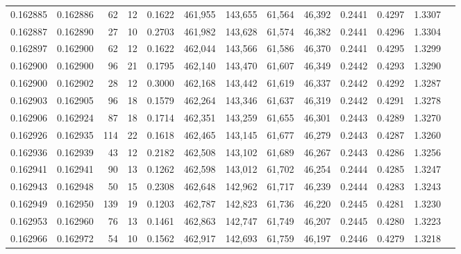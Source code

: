 \begin{tabular}{rrrrrrrrrrrrr}
0.162885 & 0.162886 &    62 &  12 &                                     0.1622 & 461,955 & 143,655 &  61,564 &  46,392 & 0.2441 & 0.4297 & 1.3307 \\
0.162887 & 0.162890 &    27 &  10 &                                     0.2703 & 461,982 & 143,628 &  61,574 &  46,382 & 0.2441 & 0.4296 & 1.3304 \\
0.162897 & 0.162900 &    62 &  12 &                                     0.1622 & 462,044 & 143,566 &  61,586 &  46,370 & 0.2441 & 0.4295 & 1.3299 \\
0.162900 & 0.162900 &    96 &  21 &                                     0.1795 & 462,140 & 143,470 &  61,607 &  46,349 & 0.2442 & 0.4293 & 1.3290 \\
0.162900 & 0.162902 &    28 &  12 &                                     0.3000 & 462,168 & 143,442 &  61,619 &  46,337 & 0.2442 & 0.4292 & 1.3287 \\
0.162903 & 0.162905 &    96 &  18 &                                     0.1579 & 462,264 & 143,346 &  61,637 &  46,319 & 0.2442 & 0.4291 & 1.3278 \\
0.162906 & 0.162924 &    87 &  18 &                                     0.1714 & 462,351 & 143,259 &  61,655 &  46,301 & 0.2443 & 0.4289 & 1.3270 \\
0.162926 & 0.162935 &   114 &  22 &                                     0.1618 & 462,465 & 143,145 &  61,677 &  46,279 & 0.2443 & 0.4287 & 1.3260 \\
0.162936 & 0.162939 &    43 &  12 &                                     0.2182 & 462,508 & 143,102 &  61,689 &  46,267 & 0.2443 & 0.4286 & 1.3256 \\
0.162941 & 0.162941 &    90 &  13 &                                     0.1262 & 462,598 & 143,012 &  61,702 &  46,254 & 0.2444 & 0.4285 & 1.3247 \\
0.162943 & 0.162948 &    50 &  15 &                                     0.2308 & 462,648 & 142,962 &  61,717 &  46,239 & 0.2444 & 0.4283 & 1.3243 \\
0.162949 & 0.162950 &   139 &  19 &                                     0.1203 & 462,787 & 142,823 &  61,736 &  46,220 & 0.2445 & 0.4281 & 1.3230 \\
0.162953 & 0.162960 &    76 &  13 &                                     0.1461 & 462,863 & 142,747 &  61,749 &  46,207 & 0.2445 & 0.4280 & 1.3223 \\
0.162966 & 0.162972 &    54 &  10 &                                     0.1562 & 462,917 & 142,693 &  61,759 &  46,197 & 0.2446 & 0.4279 & 1.3218 \\

\end{tabular}
